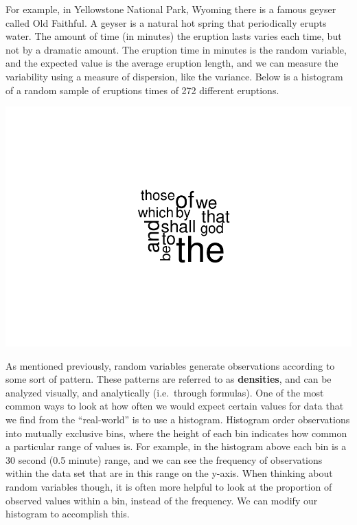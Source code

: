 \documentclass[
]{book}
\newenvironment{Shaded}{\begin{snugshade}}{\end{snugshade}}
\newcommand{\DataTypeTok}[1]{\textcolor[rgb]{0.13,0.29,0.53}{#1}}
\newcommand{\DecValTok}[1]{\textcolor[rgb]{0.00,0.00,0.81}{#1}}
\newcommand{\FloatTok}[1]{\textcolor[rgb]{0.00,0.00,0.81}{#1}}
\newcommand{\KeywordTok}[1]{\textcolor[rgb]{0.13,0.29,0.53}{\textbf{#1}}}
\newcommand{\NormalTok}[1]{#1}
\newcommand{\OperatorTok}[1]{\textcolor[rgb]{0.81,0.36,0.00}{\textbf{#1}}}
\newcommand{\StringTok}[1]{\textcolor[rgb]{0.31,0.60,0.02}{#1}}
\begin{document}
For example, in Yellowstone National Park, Wyoming there is a famous geyser called Old Faithful. A geyser is a natural hot spring that periodically erupts water. The amount of time (in minutes) the eruption lasts varies each time, but not by a dramatic amount. The eruption time in minutes is the random variable, and the expected value is the average eruption length, and we can measure the variability using a measure of dispersion, like the variance. Below is a histogram of a random sample of eruptions times of 272 different eruptions.

\begin{Shaded}
\end{Shaded}

\includegraphics{_main_files/figure-latex/unnamed-chunk-215-1.pdf}

As mentioned previously, random variables generate observations according to some sort of pattern. These patterns are referred to as \textbf{densities}, and can be analyzed visually, and analytically (i.e.~through formulas). One of the most common ways to look at how often we would expect certain values for data that we find from the ``real-world'' is to use a histogram. Histogram order observations into mutually exclusive bins, where the height of each bin indicates how common a particular range of values is. For example, in the histogram above each bin is a 30 second (0.5 minute) range, and we can see the frequency of observations within the data set that are in this range on the y-axis. When thinking about random variables though, it is often more helpful to look at the proportion of observed values within a bin, instead of the frequency. We can modify our histogram to accomplish this.
\end{document}
